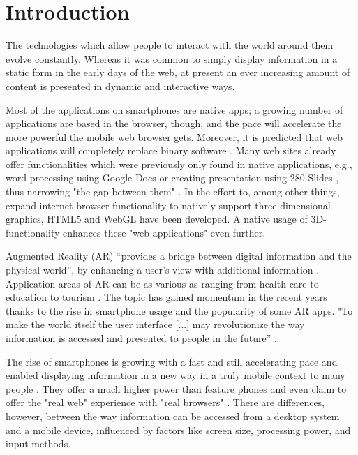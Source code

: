 \documentclass[12pt,journal,compsoc]{IEEEtran}
\begin{document}
\maketitle

\IEEEdisplaynotcompsoctitleabstractindextext
\IEEEpeerreviewmaketitle


\section{Introduction}
The technologies which allow people to interact with the world around them evolve constantly. Whereas it was common to simply display information in a static form in the early days of the web, at present an ever increasing amount of content is presented in dynamic and interactive ways. 

Most of the applications on smartphones are native apps; a growing number of applications are based in the browser, though, and the pace will accelerate the more powerful the mobile web browser gets. Moreover, it is predicted that web applications will completely replace binary software \cite{Taivalsaari2011}. Many web sites already offer functionalities which were previously only found in native applications, e.g., word processing using Google Docs \cite{googledocs} or creating presentation using 280 Slides \cite{280slides}, thus narrowing "the gap between them" \cite{Golubovic2011}. In the effort to, among other things, expand internet browser functionality to natively support three-dimensional graphics, HTML5 and WebGL have been developed. A native usage of 3D-functionality enhances these "web applications" even further.

Augmented Reality (AR) “provides a bridge between digital information and the physical world”, by enhancing a user’s view with additional information \cite{Olsson2011b}. Application areas of AR can be as various as ranging from health care \cite{Lui2011} to education \cite{Mannuss2011, Liestol2011} to tourism \cite{Mulloni2011}. The topic has gained momentum in the recent years thanks to the rise in smartphone usage and the popularity of some AR apps. "To make the world itself the user interface [...] may revolutionize the way information is accessed and presented to people in the future” \cite{Hoellerer2004,Wellner1993}.

The rise of smartphones is growing with a fast and still accelerating pace and enabled displaying information in a new way in a truly mobile context to many people \cite{Gartner2010,Nielsen2011}. They offer a much higher power than feature phones and even claim to offer the "real web" experience with "real browsers" \cite{informationweek2007}. There are differences, however, between the way information can be accessed from a desktop system and a mobile device, influenced by factors like screen size, processing power, and input methods.
\end{document}
